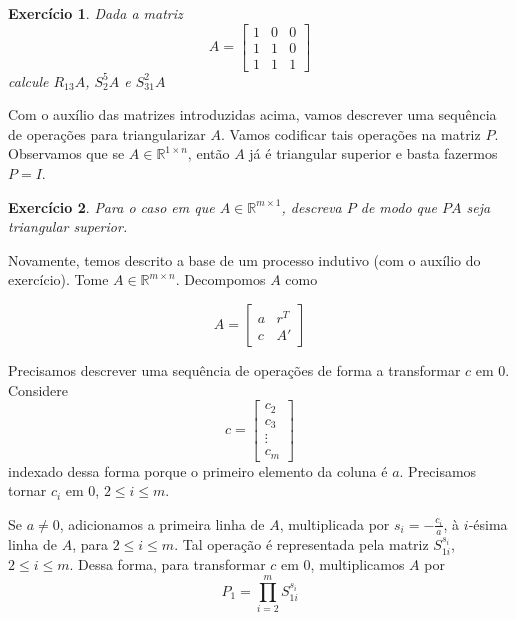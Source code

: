\documentclass[]{article}
\newtheorem{exercicio}{Exercício}
\numberwithin{equation}{section}
\begin{document}
\begin{exercicio}
	Dada a matriz
	$$
	A =
	\begin{bmatrix}
	1 & 0 & 0 \\
	1 & 1 & 0 \\
	1 & 1 & 1
	\end{bmatrix}
	$$
	calcule $R_{13} A$, $S_2^5 A$ e $S_{31}^2 A$
\end{exercicio}

Com o auxílio das matrizes introduzidas acima, vamos descrever uma sequência de operações para triangularizar $A$. Vamos codificar tais operações na matriz $P$. Observamos que se $A \in \mathbb{R}^{1 \times n}$, então $A$ já é triangular superior e basta fazermos $P = I$.

\begin{exercicio}
	Para o caso em que $A \in \mathbb{R}^{m \times 1}$, descreva $P$ de modo que $PA$ seja triangular superior.
\end{exercicio}

Novamente, temos descrito a base de um processo indutivo (com o auxílio do exercício). Tome $A \in \mathbb{R}^{m \times n}$. Decompomos $A$ como

$$
A =
\begin{bmatrix}
a & r^T \\
c & A'
\end{bmatrix}
$$

Precisamos descrever uma sequência de operações de forma a transformar $c$ em 0. Considere
$$
c =
\begin{bmatrix}
c_2 \\
c_3 \\
\vdots \\
c_m
\end{bmatrix}
$$
indexado dessa forma porque o primeiro elemento da coluna é $a$. Precisamos tornar $c_i$ em 0, $2 \leq i \leq m$.

Se $a \neq 0$, adicionamos a primeira linha de $A$, multiplicada por $s_i = -\frac{c_i}{a}$, à $i$-ésima linha de $A$, para $2 \leq i \leq m$. Tal operação é representada pela matriz $S_{1i}^{s_i}$, $2 \leq i \leq m$. Dessa forma, para transformar $c$ em 0, multiplicamos $A$ por
$$
P_1 = \prod_{i = 2}^m S_{1i}^{s_i}
$$
\end{document}

